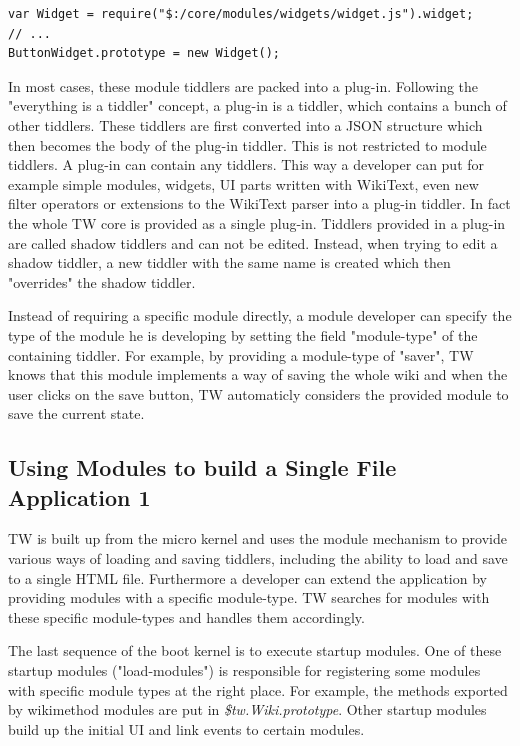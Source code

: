 \documentclass[12pt,a4paper]{scrartcl}
\begin{document}
\begin{lstlisting}[caption={Import other modules by using require()},label=lst:require]
var Widget = require("$:/core/modules/widgets/widget.js").widget;
// ...
ButtonWidget.prototype = new Widget();
\end{lstlisting}

In most cases, these module tiddlers are packed into a plug-in.
Following the "everything is a tiddler" concept, a plug-in is a tiddler, which contains a bunch of other tiddlers. These tiddlers are first converted into a JSON structure which then becomes the body of the plug-in tiddler.
This is not restricted to module tiddlers. A plug-in can contain any tiddlers. This way a developer can put for example simple modules, widgets, UI parts written with WikiText, even new filter operators or extensions to the WikiText parser into a plug-in tiddler. In fact the whole TW core is provided as a single plug-in. Tiddlers provided in a plug-in are called shadow tiddlers and can not be edited. Instead, when trying to edit a shadow tiddler, a new tiddler with the same name is created which then "overrides" the shadow tiddler.

Instead of requiring a specific module directly, a module developer can specify the type of the module he is developing by setting the field "module-type" of the containing tiddler.
For example, by providing a module-type of "saver", TW knows that this module implements a way of saving the whole wiki and when the user clicks on the save button, TW automaticly considers the provided module to save the current state.

\subsection{Using Modules to build a Single File Application 1}
TW is built up from the micro kernel and uses the module mechanism to provide various ways of loading and saving tiddlers, including the ability to load and save to a single HTML file.
Furthermore a developer can extend the application by providing modules with a specific module-type. TW searches for modules with these specific module-types and handles them accordingly.

The last sequence of the boot kernel is to execute startup modules. One of these startup modules ("load-modules") is responsible for registering some modules with specific module types at the right place. For example, the methods exported by wikimethod modules are put in \textit{\$tw.Wiki.prototype}. Other startup modules build up the initial UI and link events to certain modules.
\end{document}
